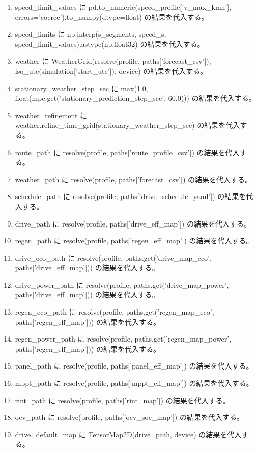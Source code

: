 \documentclass[a4paper,11pt]{article}
\begin{document}
\begin{enumerate}[leftmargin=1.8em]
\item speed\_limit\_values に pd.to\_numeric(speed\_profile['v\_max\_kmh'], errors='coerce').to\_numpy(dtype=float) の結果を代入する。
\item speed\_limits に np.interp(s\_segments, speed\_s, speed\_limit\_values).astype(np.float32) の結果を代入する。
\item weather に WeatherGrid(resolve(profile, paths['forecast\_csv']), iso\_utc(simulation['start\_utc']), device) の結果を代入する。
\item stationary\_weather\_step\_sec に max(1.0, float(mpc.get('stationary\_prediction\_step\_sec', 60.0))) の結果を代入する。
\item weather\_refinement に weather.refine\_time\_grid(stationary\_weather\_step\_sec) の結果を代入する。
\item route\_path に resolve(profile, paths['route\_profile\_csv']) の結果を代入する。
\item weather\_path に resolve(profile, paths['forecast\_csv']) の結果を代入する。
\item schedule\_path に resolve(profile, paths['drive\_schedule\_yaml']) の結果を代入する。
\item drive\_path に resolve(profile, paths['drive\_eff\_map']) の結果を代入する。
\item regen\_path に resolve(profile, paths['regen\_eff\_map']) の結果を代入する。
\item drive\_eco\_path に resolve(profile, paths.get('drive\_map\_eco', paths['drive\_eff\_map'])) の結果を代入する。
\item drive\_power\_path に resolve(profile, paths.get('drive\_map\_power', paths['drive\_eff\_map'])) の結果を代入する。
\item regen\_eco\_path に resolve(profile, paths.get('regen\_map\_eco', paths['regen\_eff\_map'])) の結果を代入する。
\item regen\_power\_path に resolve(profile, paths.get('regen\_map\_power', paths['regen\_eff\_map'])) の結果を代入する。
\item panel\_path に resolve(profile, paths['panel\_eff\_map']) の結果を代入する。
\item mppt\_path に resolve(profile, paths['mppt\_eff\_map']) の結果を代入する。
\item rint\_path に resolve(profile, paths['rint\_map']) の結果を代入する。
\item ocv\_path に resolve(profile, paths['ocv\_soc\_map']) の結果を代入する。
\item drive\_default\_map に TensorMap2D(drive\_path, device) の結果を代入する。

\end{enumerate}
\end{document}
